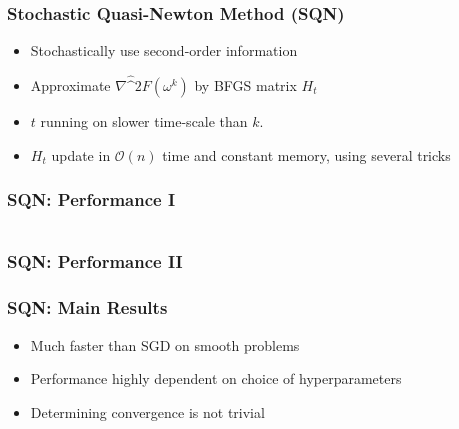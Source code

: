 \documentclass[10pt]{beamer}
\begin{document}
  \begin{frame}\frametitle{Stochastic Quasi-Newton Method (SQN)}
      \begin{itemize}
        \item \alert{Stochastically} use second-order information
        \item Approximate $\nabla \hat^2 F(\omega^{k})$ by BFGS matrix $H_t$
        \item $t$ running on slower time-scale than $k$. 
        \item $H_t$ update in $\mathcal O(n)$ time and constant memory, using several tricks
      \end{itemize}
  \end{frame}


  \begin{frame}
    \frametitle{SQN: Performance I}

      \begin{columns}[T]
      \begin{column}{.5\textwidth}
        \resizebox{\linewidth}{!}{}
      \end{column}\hfill
      \begin{column}{.5\textwidth}
        \resizebox{\linewidth}{!}{}
      \end{column}
    \end{columns}
  \end{frame}

  \begin{frame}
    \frametitle{SQN: Performance II}
    \resizebox{0.8\linewidth}{!}{}
  \end{frame}

  \begin{frame}\frametitle{SQN: Main Results}
    \begin{itemize}
      \item Much faster than SGD on smooth problems
      \item Performance highly dependent on choice of hyperparameters
      \item Determining convergence is not trivial
    \end{itemize}
  
  \end{frame}
\end{document}
